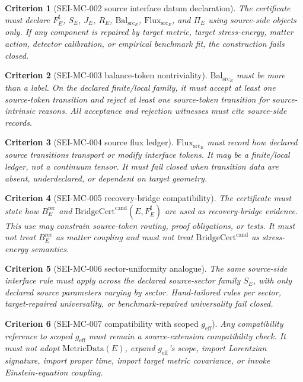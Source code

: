\documentclass[11pt]{article}
\newcommand{\MetricData}{\mathrm{MetricData}}
\newcommand{\geff}{g_{\mathrm{eff}}}
\newcommand{\BridgeCertCand}{\mathrm{BridgeCert}^{\mathrm{cand}}}
\newcommand{\BErec}{B_E^{\mathrm{rec}}}
\newcommand{\BalSrc}{\mathrm{Bal}_{\mathrm{src}}}
\newcommand{\FluxSrc}{\mathrm{Flux}_{\mathrm{src}}}
\newtheorem{criterion}{Criterion}
\begin{document}
\begin{criterion}[SEI-MC-002 source interface datum declaration]
The certificate must declare \(F_E^\sharp\), \(S_E\), \(J_E\), \(R_E\),
\(\BalSrc_E\), \(\FluxSrc_E\), and \(\Pi_E\) using source-side objects only.
If any component is repaired by target metric, target stress-energy, matter
action, detector calibration, or empirical benchmark fit, the construction
fails closed.
\end{criterion}

\begin{criterion}[SEI-MC-003 balance-token nontriviality]
\(\BalSrc_E\) must be more than a label. On the declared finite/local family,
it must accept at least one source-token transition and reject at least one
source-token transition for source-intrinsic reasons. All acceptance and
rejection witnesses must cite source-side records.
\end{criterion}

\begin{criterion}[SEI-MC-004 source flux ledger]
\(\FluxSrc_E\) must record how declared source transitions transport or
modify interface tokens. It may be a finite/local ledger, not a continuum
tensor. It must fail closed when transition data are absent, underdeclared, or
dependent on target geometry.
\end{criterion}

\begin{criterion}[SEI-MC-005 recovery-bridge compatibility]
The certificate must state how \(\BErec\) and
\(\BridgeCertCand(E,F_E^\sharp)\) are used as recovery-bridge evidence. This
use may constrain source-token routing, proof obligations, or tests. It must
not treat \(\BErec\) as matter coupling and must not treat
\(\BridgeCertCand\) as stress-energy semantics.
\end{criterion}

\begin{criterion}[SEI-MC-006 sector-uniformity analogue]
The same source-side interface rule must apply across the declared
source-sector family \(S_E\), with only declared source parameters varying by
sector. Hand-tailored rules per sector, target-repaired universality, or
benchmark-repaired universality fail closed.
\end{criterion}

\begin{criterion}[SEI-MC-007 compatibility with scoped \(\geff\)]
Any compatibility reference to scoped \(\geff\) must remain a source-extension
compatibility check. It must not adopt \(\MetricData(E)\), expand \(\geff\)'s
scope, import Lorentzian signature, import proper time, import target metric
covariance, or invoke Einstein-equation coupling.
\end{criterion}
\end{document}
